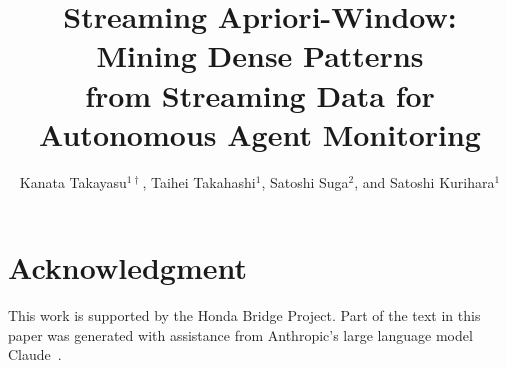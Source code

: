 \documentclass[10pt,twocolumn]{AROB}
\title{Streaming Apriori-Window: Mining Dense Patterns\\
       from Streaming Data for Autonomous Agent Monitoring}
\author{Kanata Takayasu${}^{1\dagger}$, Taihei Takahashi${}^{1}$,
        Satoshi Suga${}^{2}$, and Satoshi Kurihara${}^{1}$}
\begin{document}
\maketitle















\section*{Acknowledgment}
This work is supported by the Honda Bridge Project.
Part of the text in this paper was generated with assistance from Anthropic's large language model Claude~\cite{claude2025}.

\end{document}
